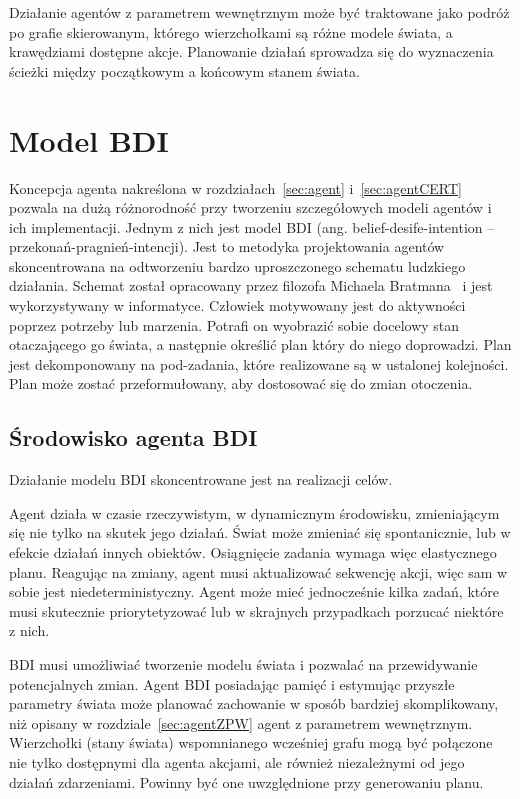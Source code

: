 Działanie agentów z parametrem wewnętrznym może być traktowane jako podróż po grafie skierowanym, którego wierzchołkami są różne modele świata, a krawędziami dostępne akcje. Planowanie działań sprowadza się do wyznaczenia ścieżki między początkowym a końcowym stanem świata.

\section{Model BDI}
\label{sec:BDI}
Koncepcja agenta nakreślona w rozdziałach~\ref{sec:agent} i~\ref{sec:agentCERT} pozwala na dużą różnorodność przy tworzeniu szczegółowych modeli agentów i ich implementacji. Jednym z nich jest model BDI (ang. belief-desife-intention -- przekonań-pragnień-intencji). 
Jest to metodyka projektowania agentów skoncentrowana na odtworzeniu bardzo uproszczonego schematu ludzkiego działania. Schemat został opracowany przez filozofa Michaela Bratmana~\cite{bratman1987intention} i jest wykorzystywany w informatyce. Człowiek motywowany jest do aktywności poprzez potrzeby lub marzenia. Potrafi on wyobrazić sobie docelowy stan otaczającego go świata, a następnie określić plan który do niego doprowadzi. Plan jest dekomponowany na pod-zadania, które realizowane są w ustalonej kolejności. Plan może zostać przeformułowany, aby dostosować się do zmian otoczenia.

\subsection{Środowisko agenta BDI}
\label{subsec:BDIenv}
Działanie modelu BDI skoncentrowane jest na realizacji celów. 

Agent działa w czasie rzeczywistym, w dynamicznym środowisku, zmieniającym się nie tylko na skutek jego działań. Świat może zmieniać się spontanicznie, lub w efekcie działań innych obiektów. Osiągnięcie zadania wymaga więc elastycznego planu. Reagując na zmiany, agent musi aktualizować sekwencję akcji, więc sam w sobie jest niedeterministyczny. Agent może mieć jednocześnie kilka zadań, które musi skutecznie priorytetyzować lub w skrajnych przypadkach porzucać niektóre z nich.~\cite{RAO} %

BDI musi umożliwiać tworzenie modelu świata i pozwalać na przewidywanie potencjalnych zmian. Agent BDI posiadając pamięć i estymując przyszłe parametry świata może planować zachowanie w sposób bardziej skomplikowany, niż opisany w rozdziale~\ref{sec:agentZPW} agent z parametrem wewnętrznym. Wierzchołki (stany świata) wspomnianego wcześniej grafu mogą być połączone nie tylko dostępnymi dla agenta akcjami, ale również niezależnymi od jego działań zdarzeniami. Powinny być one uwzględnione przy generowaniu planu.

